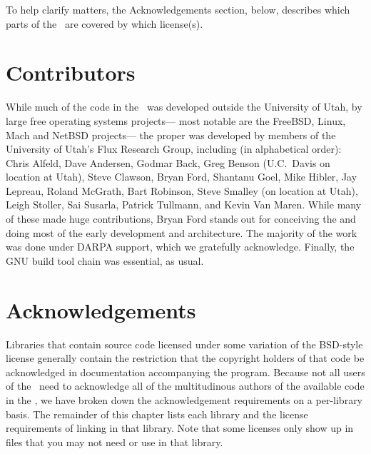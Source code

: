 To help clarify matters, the Acknowledgements section, below,
describes which parts of the \oskit\ are covered by which license(s).

\section{Contributors} %

While much of the code in the \oskit\ was developed outside the
University of Utah, by large free operating systems projects---%
most notable are the FreeBSD, Linux, Mach and NetBSD projects---%
the \oskit{} proper was developed by members of the University
of Utah's Flux Research Group, including (in alphabetical order):
	Chris Alfeld,	%
	Dave Andersen,	%
	Godmar Back, %
	Greg Benson (U.C.\ Davis on location at Utah), %
	Steve Clawson, %
	Bryan Ford,  %
	Shantanu Goel, %
	Mike Hibler, %
	Jay Lepreau,	%
	Roland McGrath,	%
	Bart Robinson, %
	Steve Smalley (on location at Utah), %
	Leigh Stoller,	%
	Sai Susarla, %
	Patrick Tullmann, %
	and
	Kevin Van Maren. %
While many of these made huge contributions, Bryan Ford stands out for
conceiving the \oskit{} and doing most of the early development and
architecture.  The majority of the \oskit{} work was done under DARPA
support, which we gratefully acknowledge.  Finally, the GNU build tool
chain was essential, as usual.

\section{Acknowledgements}

Libraries that contain source code licensed under some variation of
the BSD-style license generally contain the restriction that the
copyright holders of that code be acknowledged in documentation
accompanying the program.  Because not all users of the \oskit\ need to
acknowledge all of the multitudinous authors of the available code in
the \oskit, we have broken down the acknowledgement requirements on a
per-library basis.  The remainder of this chapter lists each library
and the license requirements of linking in that library.  Note that
some licenses only show up in files that you may not need or use in
that library.

